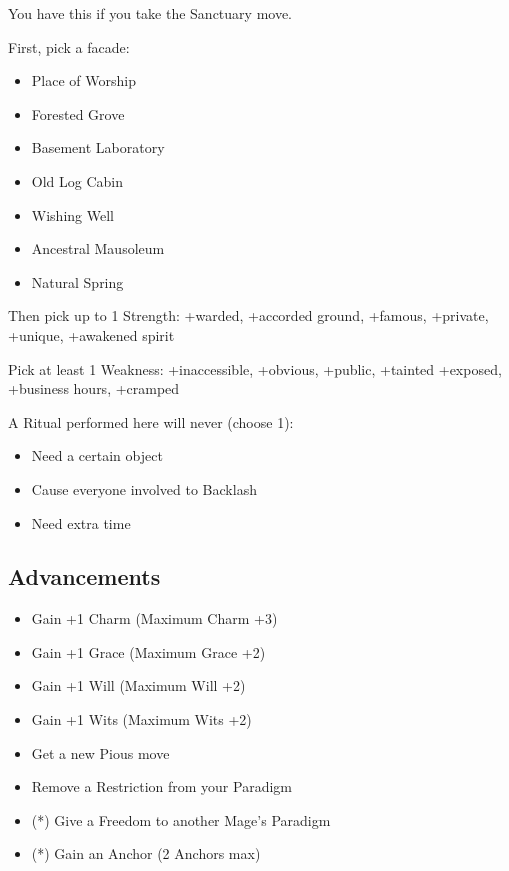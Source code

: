 \documentclass[10pt,twoside,openright]{memoir}
\begin{document}
You have this if you take the Sanctuary move.

First, pick a facade:

\begin{itemize}
\tightlist
\item
  Place of Worship
\item
  Forested Grove
\item
  Basement Laboratory
\item
  Old Log Cabin
\item
  Wishing Well
\item
  Ancestral Mausoleum
\item
  Natural Spring
\end{itemize}

Then pick up to 1 Strength: +warded, +accorded ground, +famous,
+private, +unique, +awakened spirit

Pick at least 1 Weakness: +inaccessible, +obvious, +public, +tainted
+exposed, +business hours, +cramped

A Ritual performed here will never (choose 1):

\begin{itemize}
\tightlist
\item
  Need a certain object
\item
  Cause everyone involved to Backlash
\item
  Need extra time
\end{itemize}

\hypertarget{advancements-4}{%
\subsection{Advancements}\label{advancements-4}}

\begin{itemize}
\tightlist
\item
  Gain +1 Charm (Maximum Charm +3)
\item
  Gain +1 Grace (Maximum Grace +2)
\item
  Gain +1 Will (Maximum Will +2)
\item
  Gain +1 Wits (Maximum Wits +2)
\item
  Get a new Pious move
\item
  Remove a Restriction from your Paradigm
\item
  (*) Give a Freedom to another Mage's Paradigm
\item
  (*) Gain an Anchor (2 Anchors max)
\end{itemize}
\end{document}
